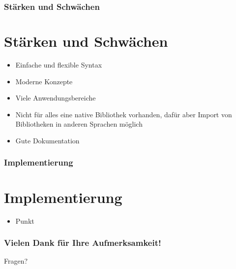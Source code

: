 \documentclass{beamer}
\begin{document}
\begin{frame}
\frametitle{Stärken und Schwächen}
\section{Stärken und Schwächen}
\begin{itemize}
	\item Einfache und flexible Syntax
	\item Moderne Konzepte
	\item Viele Anwendungsbereiche
	\item Nicht für alles eine native Bibliothek vorhanden, dafür aber Import von Bibliotheken in anderen Sprachen möglich
	\item Gute Dokumentation
\end{itemize}
\end{frame}


\begin{frame}
\frametitle{Implementierung}
\section{Implementierung}
\begin{itemize}
	\item Punkt
\end{itemize}
\end{frame}

\appendix

\begin{frame}
\frametitle{Vielen Dank für Ihre Aufmerksamkeit!}
Fragen?
\end{frame}
\end{document}
